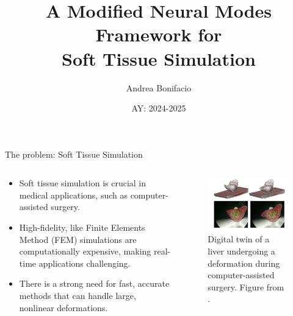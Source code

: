 \documentclass[9pt]{beamer}
\title{A Modified Neural Modes Framework for\\ Soft Tissue Simulation}
\author{Andrea Bonifacio }
\date{AY: 2024-2025  \vspace{-5em} \hspace{2cm} \supervisors{Prof. Stefano Pagani}{Dr. Stéphane Cotin}
}
\begin{document}
\begin{frame}
\titlepage
\end{frame}

\begin{frame}{The problem: Soft Tissue Simulation}
    \begin{columns}[T]
        \begin{column}{0.6\textwidth}
            \begin{itemize}
                \item Soft tissue simulation is crucial in medical applications, such as computer-assisted surgery.
                \item High-fidelity, like Finite Elements Method (FEM) simulations are computationally expensive, making real-time applications challenging.
                \item There is a strong need for fast, accurate methods that can handle large, nonlinear deformations.
            \end{itemize}
        \end{column}
        \begin{column}{0.4\textwidth}
            \begin{figure}
                \centering
                    \includegraphics[width=\textwidth]{Images/liver_2.png}
                    \caption{Digital twin of a liver undergoing a deformation during computer-assisted surgery. Figure from \cite{Haouchine_Dequidt_Peterlik_Kerrien_Berger_Cotin_2013}.}
            \end{figure}
        \end{column}
    \end{columns}
\end{frame}
\end{document}
